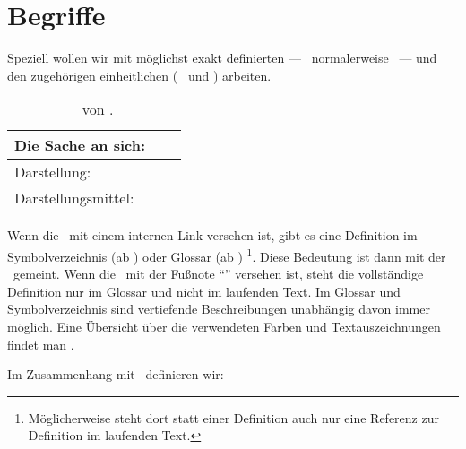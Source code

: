\footnoteForNotDefinedItem

\section     {Begriffe}%
\label   {sec:Begriffe}

Speziell  wollen wir mit möglichst exakt definierten  --- \hier\ normalerweise \Objekte\ --- und den zugehörigen einheitlichen  (\textdh\  und \Symbolketten) arbeiten.

\begin{table}[h]
	\begin{center}
		\begin{tabular}{|l|c|c|}
			\hline
			Die Sache an sich:  & \multicolumn{2}{c|}{\Begriff}     \\
			\hline
			Darstellung:        & \multicolumn{2}{c|}{\Bezeichnung} \\
			Darstellungsmittel: & \Benennung       &  \Symbolkette  \\
			\hline
		\end{tabular}
		\caption{\Bezeichnung\ von \Begriffen.}
		\label{tab:Bezeichnung}%
	\end{center}
\end{table}

Wenn die \Bezeichnung\ mit einem internen Link versehen ist, gibt es eine Definition im Symbolverzeichnis (ab ) oder Glossar (ab )%
\footnote{%
	Möglicherweise steht dort statt einer Definition auch nur eine Referenz zur Definition im laufenden Text.
}.
Diese Bedeutung ist dann mit der \Bezeichnung\ gemeint.
Wenn die \Benennung\ mit der Fußnote "`\footnotemark[0]"' versehen ist, steht die vollständige Definition nur im Glossar und nicht im laufenden Text.
Im Glossar und Symbolverzeichnis sind vertiefende Beschreibungen unabhängig davon immer möglich.
Eine Übersicht über die verwendeten Farben und Textauszeichnungen findet man .

Im Zusammenhang mit \Bezeichnungen\ definieren wir:

